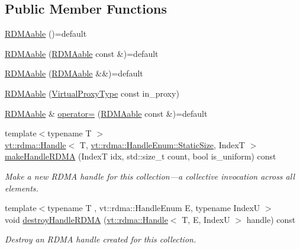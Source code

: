 \subsection*{Public Member Functions}
\begin{DoxyCompactItemize}
\item 
\hyperlink{structvt_1_1vrt_1_1collection_1_1_r_d_m_aable_af26e9e951d466ed7ced91adaf495b6cd}{R\+D\+M\+Aable} ()=default
\item 
\hyperlink{structvt_1_1vrt_1_1collection_1_1_r_d_m_aable_a03d580ecebe0bffebe79272af156899c}{R\+D\+M\+Aable} (\hyperlink{structvt_1_1vrt_1_1collection_1_1_r_d_m_aable}{R\+D\+M\+Aable} const \&)=default
\item 
\hyperlink{structvt_1_1vrt_1_1collection_1_1_r_d_m_aable_a5b5055174533c011cc0fb8d0eb36b13c}{R\+D\+M\+Aable} (\hyperlink{structvt_1_1vrt_1_1collection_1_1_r_d_m_aable}{R\+D\+M\+Aable} \&\&)=default
\item 
\hyperlink{structvt_1_1vrt_1_1collection_1_1_r_d_m_aable_a8e246341e17012efae4f42b6d317595e}{R\+D\+M\+Aable} (\hyperlink{namespacevt_a1b417dd5d684f045bb58a0ede70045ac}{Virtual\+Proxy\+Type} const in\+\_\+proxy)
\item 
\hyperlink{structvt_1_1vrt_1_1collection_1_1_r_d_m_aable}{R\+D\+M\+Aable} \& \hyperlink{structvt_1_1vrt_1_1collection_1_1_r_d_m_aable_adabf09e2a2616594bc4e087c22c668f6}{operator=} (\hyperlink{structvt_1_1vrt_1_1collection_1_1_r_d_m_aable}{R\+D\+M\+Aable} const \&)=default
\item 
{\footnotesize template$<$typename T $>$ }\\\hyperlink{structvt_1_1rdma_1_1_handle}{vt\+::rdma\+::\+Handle}$<$ T, \hyperlink{namespacevt_1_1rdma_a0234ff19cfb3c04718cfdfd36b2d6d88a0c5c41d6a0319a61d3a5e8a060b7c4d7}{vt\+::rdma\+::\+Handle\+Enum\+::\+Static\+Size}, IndexT $>$ \hyperlink{structvt_1_1vrt_1_1collection_1_1_r_d_m_aable_a220f2637cb911ba9cb7bbc1ee11d960f}{make\+Handle\+R\+D\+MA} (IndexT idx, std\+::size\+\_\+t count, bool is\+\_\+uniform) const
\begin{DoxyCompactList}\small\item\em Make a new R\+D\+MA handle for this collection---a collective invocation across all elements. \end{DoxyCompactList}\item 
{\footnotesize template$<$typename T , vt\+::rdma\+::\+Handle\+Enum E, typename IndexU $>$ }\\void \hyperlink{structvt_1_1vrt_1_1collection_1_1_r_d_m_aable_ab7b416ab8ea4643f17fde1e95ce4bea5}{destroy\+Handle\+R\+D\+MA} (\hyperlink{structvt_1_1rdma_1_1_handle}{vt\+::rdma\+::\+Handle}$<$ T, E, IndexU $>$ handle) const
\begin{DoxyCompactList}\small\item\em Destroy an R\+D\+MA handle created for this collection. \end{DoxyCompactList}\end{DoxyCompactItemize}


